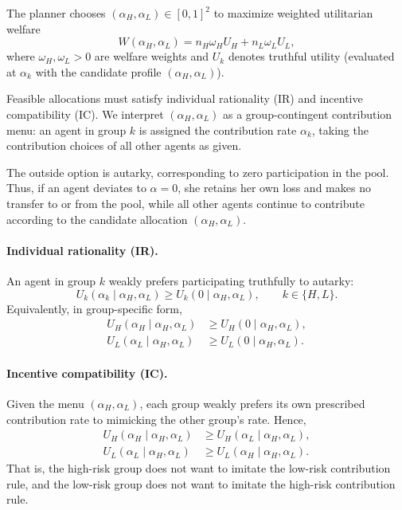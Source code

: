 \documentclass[a4paper,12pt]{article}
\theoremstyle{definition}
\theoremstyle{remark}
\newcommand{\1}{\mathbf{1}}
\begin{document}
The planner chooses \((\alpha_H,\alpha_L)\in[0,1]^2\) to maximize weighted utilitarian welfare
\begin{equation}\label{eq:welfare-general}
W(\alpha_H,\alpha_L)
=
n_H\omega_H U_H
+
n_L\omega_L U_L,
\end{equation}
where \(\omega_H,\omega_L>0\) are welfare weights and \(U_k\) denotes truthful utility (evaluated at \(\alpha_k\) with the candidate profile \((\alpha_H,\alpha_L)\)).

Feasible allocations must satisfy individual rationality (IR) and incentive compatibility (IC). We interpret \((\alpha_H,\alpha_L)\) as a group-contingent contribution menu: an agent in group \(k\) is assigned the contribution rate \(\alpha_k\), taking the contribution choices of all other agents as given.

The outside option is autarky, corresponding to zero participation in the pool. Thus, if an agent deviates to \(\alpha=0\), she retains her own loss and makes no transfer to or from the pool, while all other agents continue to contribute according to the candidate allocation \((\alpha_H,\alpha_L)\).

\paragraph{Individual rationality (IR).}
An agent in group \(k\) weakly prefers participating truthfully to autarky:
\begin{equation}\label{eq:IR-k}
U_k(\alpha_k \mid \alpha_H,\alpha_L)\ge U_k(0 \mid \alpha_H,\alpha_L),
\qquad k\in\{H,L\}.
\end{equation}
Equivalently, in group-specific form,
\begin{align}
U_H(\alpha_H \mid \alpha_H,\alpha_L) &\ge U_H(0 \mid \alpha_H,\alpha_L), \label{eq:IR-H}\\
U_L(\alpha_L \mid \alpha_H,\alpha_L) &\ge U_L(0 \mid \alpha_H,\alpha_L). \label{eq:IR-L}
\end{align}

\paragraph{Incentive compatibility (IC).}
Given the menu \((\alpha_H,\alpha_L)\), each group weakly prefers its own prescribed contribution rate to mimicking the other group's rate. Hence,
\begin{subequations}\label{eq:IC}
\begin{align}
U_H(\alpha_H \mid \alpha_H,\alpha_L) 
&\ge U_H(\alpha_L \mid \alpha_H,\alpha_L), \label{eq:IC-H}\\
U_L(\alpha_L \mid \alpha_H,\alpha_L) 
&\ge U_L(\alpha_H \mid \alpha_H,\alpha_L). \label{eq:IC-L}
\end{align}
\end{subequations}
That is, the high-risk group does not want to imitate the low-risk contribution rule, and the low-risk group does not want to imitate the high-risk contribution rule.
\end{document}
